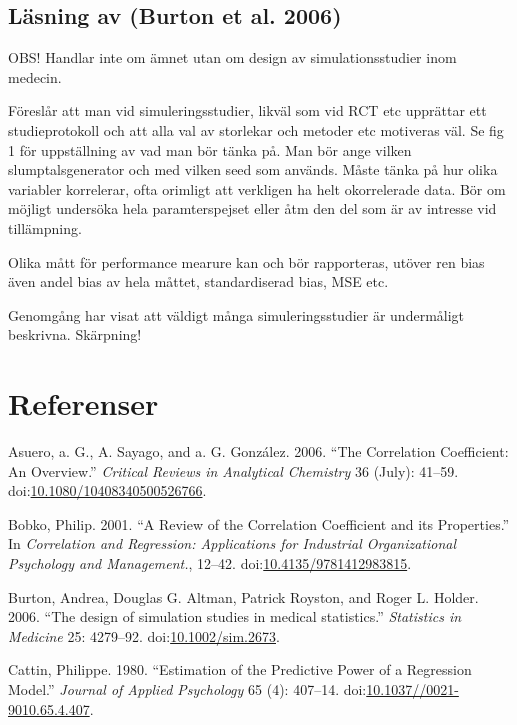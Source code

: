 \documentclass[]{article}
\begin{document}
\subsection{Läsning av (Burton et al.
2006)}\label{lasning-av-burton2006}

OBS! Handlar inte om ämnet utan om design av simulationsstudier inom
medecin.

Föreslår att man vid simuleringsstudier, likväl som vid RCT etc
upprättar ett studieprotokoll och att alla val av storlekar och metoder
etc motiveras väl. Se fig 1 för uppställning av vad man bör tänka på.
Man bör ange vilken slumptalsgenerator och med vilken seed som används.
Måste tänka på hur olika variabler korrelerar, ofta orimligt att
verkligen ha helt okorrelerade data. Bör om möjligt undersöka hela
paramterspejset eller åtm den del som är av intresse vid tillämpning.

Olika mått för performance mearure kan och bör rapporteras, utöver ren
bias även andel bias av hela måttet, standardiserad bias, MSE etc.

Genomgång har visat att väldigt många simuleringsstudier är undermåligt
beskrivna. Skärpning!

\section*{Referenser}\label{referenser}

\hypertarget{refs}{}
\hypertarget{ref-Asuero2006}{}
Asuero, a. G., A. Sayago, and a. G. González. 2006. ``The Correlation
Coefficient: An Overview.'' \emph{Critical Reviews in Analytical
Chemistry} 36 (July): 41--59.
doi:\href{https://doi.org/10.1080/10408340500526766}{10.1080/10408340500526766}.

\hypertarget{ref-Bobko2001}{}
Bobko, Philip. 2001. ``A Review of the Correlation Coefficient and its
Properties.'' In \emph{Correlation and Regression: Applications for
Industrial Organizational Psychology and Management.}, 12--42.
doi:\href{https://doi.org/10.4135/9781412983815}{10.4135/9781412983815}.

\hypertarget{ref-Burton2006}{}
Burton, Andrea, Douglas G. Altman, Patrick Royston, and Roger L. Holder.
2006. ``The design of simulation studies in medical statistics.''
\emph{Statistics in Medicine} 25: 4279--92.
doi:\href{https://doi.org/10.1002/sim.2673}{10.1002/sim.2673}.

\hypertarget{ref-Cattin1980}{}
Cattin, Philippe. 1980. ``Estimation of the Predictive Power of a
Regression Model.'' \emph{Journal of Applied Psychology} 65 (4):
407--14.
doi:\href{https://doi.org/10.1037//0021-9010.65.4.407}{10.1037//0021-9010.65.4.407}.
\end{document}
